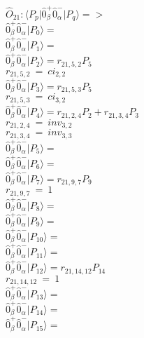 \documentclass[14pt]{article}
\begin{document}
    $\hat{O}_{21}:  \langle{P_p}\vert \hat{0}_{\beta}^{+}\hat{0}_{\alpha}^{-} \vert{P_q}\rangle => $ \\ 
    $ \hat{0}_{\beta}^{+}\hat{0}_{\alpha}^{-} \vert{P_{0}}\rangle =  $ \\ 
    $ \hat{0}_{\beta}^{+}\hat{0}_{\alpha}^{-} \vert{P_{1}}\rangle =  $ \\ 
    $ \hat{0}_{\beta}^{+}\hat{0}_{\alpha}^{-} \vert{P_{2}}\rangle = {r}_{21,5,2}P_{5} $ \\ 
    ${r}_{21,5,2}\ =\ {ci}_{2,2} $ \\ 
    $ \hat{0}_{\beta}^{+}\hat{0}_{\alpha}^{-} \vert{P_{3}}\rangle = {r}_{21,5,3}P_{5} $ \\ 
    ${r}_{21,5,3}\ =\ {ci}_{3,2} $ \\ 
    $ \hat{0}_{\beta}^{+}\hat{0}_{\alpha}^{-} \vert{P_{4}}\rangle = {r}_{21,2,4}P_{2}+{r}_{21,3,4}P_{3} $ \\ 
    ${r}_{21,2,4}\ =\ {inv}_{3,2} $ \\ 
    ${r}_{21,3,4}\ =\ {inv}_{3,3} $ \\ 
    $ \hat{0}_{\beta}^{+}\hat{0}_{\alpha}^{-} \vert{P_{5}}\rangle =  $ \\ 
    $ \hat{0}_{\beta}^{+}\hat{0}_{\alpha}^{-} \vert{P_{6}}\rangle =  $ \\ 
    $ \hat{0}_{\beta}^{+}\hat{0}_{\alpha}^{-} \vert{P_{7}}\rangle = {r}_{21,9,7}P_{9} $ \\ 
    ${r}_{21,9,7}\ =\ 1 $ \\ 
    $ \hat{0}_{\beta}^{+}\hat{0}_{\alpha}^{-} \vert{P_{8}}\rangle =  $ \\ 
    $ \hat{0}_{\beta}^{+}\hat{0}_{\alpha}^{-} \vert{P_{9}}\rangle =  $ \\ 
    $ \hat{0}_{\beta}^{+}\hat{0}_{\alpha}^{-} \vert{P_{10}}\rangle =  $ \\ 
    $ \hat{0}_{\beta}^{+}\hat{0}_{\alpha}^{-} \vert{P_{11}}\rangle =  $ \\ 
    $ \hat{0}_{\beta}^{+}\hat{0}_{\alpha}^{-} \vert{P_{12}}\rangle = {r}_{21,14,12}P_{14} $ \\ 
    ${r}_{21,14,12}\ =\ 1 $ \\ 
    $ \hat{0}_{\beta}^{+}\hat{0}_{\alpha}^{-} \vert{P_{13}}\rangle =  $ \\ 
    $ \hat{0}_{\beta}^{+}\hat{0}_{\alpha}^{-} \vert{P_{14}}\rangle =  $ \\ 
    $ \hat{0}_{\beta}^{+}\hat{0}_{\alpha}^{-} \vert{P_{15}}\rangle =  $ \\ 
    
\end{document}
